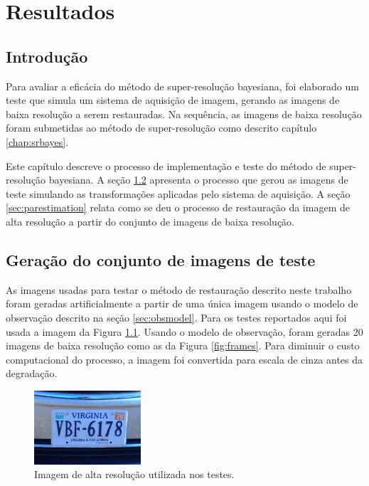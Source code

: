\chapter{Resultados}
\label{chap:resultados}
\section{Introdução}
Para avaliar a eficácia do método de super-resolução bayesiana, 
foi elaborado um teste que simula um sistema de aquisição de imagem,
gerando as imagens de baixa resolução a serem restauradas.
Na sequência, as imagens de baixa resolução foram submetidas ao método de super-resolução como descrito capítulo \ref{chap:srbayes}.

Este capítulo descreve o processo de implementação e teste do método de super-resolução bayesiana.
A seção \ref{sec:gerimagens} apresenta o processo que gerou as imagens de teste simulando as transformações aplicadas pelo sistema de aquisição.
A seção \ref{sec:parestimation} relata como se deu o processo de restauração da imagem de alta resolução a partir do conjunto de imagens de baixa resolução.

\section{Geração do conjunto de imagens de teste}
\label{sec:gerimagens}
As imagens usadas para testar o método de restauração descrito neste trabalho foram geradas artificialmente a partir de uma única imagem usando o modelo de observação descrito na seção \ref{sec:obsmodel}.
Para os testes reportados aqui foi usada a imagem da Figura \ref{fig:hrimage}.
Usando o modelo de observação, foram geradas 20 imagens de baixa resolução como as da Figura \ref{fig:frames}.
Para diminuir o custo computacional do processo, a imagem foi convertida para escala de cinza antes da degradação.

\begin{figure}[h]
	\centering
	\caption{\label{fig:hrimage}Imagem de alta resolução utilizada nos testes.}
	\includegraphics{figures/imtestes.png}

\end{figure}

